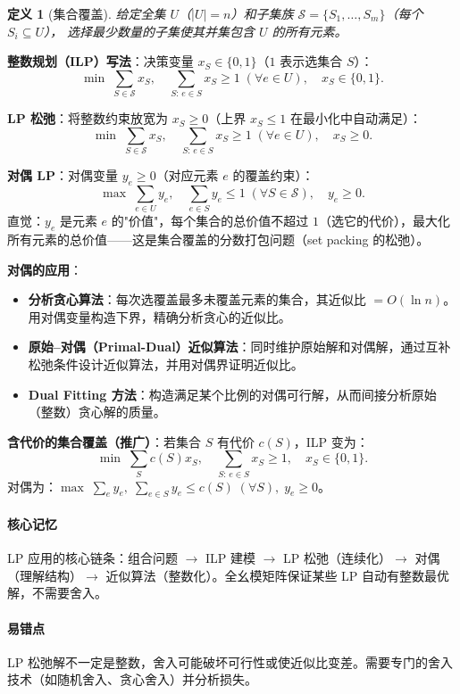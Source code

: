 \documentclass[UTF8,openany,12pt]{ctexbook}
\newtheorem{definition}{定义}[chapter]
\theoremstyle{remark}
\newcommand{\keypoint}[1]{\paragraph{核心记忆}#1}
\newcommand{\pitfall}[1]{\paragraph{易错点}#1}
\begin{document}
\begin{definition}[集合覆盖]
给定全集 $U$（$|U|=n$）和子集族 $\mathcal{S}=\{S_1,\ldots,S_m\}$（每个 $S_i\subseteq U$），
选择最少数量的子集使其并集包含 $U$ 的所有元素。
\end{definition}

\noindent\textbf{整数规划（ILP）写法}：决策变量 $x_S\in\{0,1\}$（$1$ 表示选集合 $S$）：
\[
  \min\;\sum_{S\in\mathcal{S}} x_S,\quad \sum_{S:\,e\in S}x_S\ge 1\;(\forall e\in U),\quad x_S\in\{0,1\}.
\]

\noindent\textbf{LP 松弛}：将整数约束放宽为 $x_S\ge0$（上界 $x_S\le1$ 在最小化中自动满足）：
\[
  \min\;\sum_{S\in\mathcal{S}} x_S,\quad \sum_{S:\,e\in S}x_S\ge 1\;(\forall e\in U),\quad x_S\ge 0.
\]

\noindent\textbf{对偶 LP}：对偶变量 $y_e\ge0$（对应元素 $e$ 的覆盖约束）：
\[
  \max\;\sum_{e\in U}y_e,\quad \sum_{e\in S}y_e\le 1\;(\forall S\in\mathcal{S}),\quad y_e\ge 0.
\]
直觉：$y_e$ 是元素 $e$ 的"价值"，每个集合的总价值不超过 $1$（选它的代价），最大化所有元素的总价值——这是集合覆盖的分数打包问题（set packing 的松弛）。

\noindent\textbf{对偶的应用}：
\begin{itemize}
  \item \textbf{分析贪心算法}：每次选覆盖最多未覆盖元素的集合，其近似比 $=O(\ln n)$。
        用对偶变量构造下界，精确分析贪心的近似比。
  \item \textbf{原始--对偶（Primal-Dual）近似算法}：同时维护原始解和对偶解，通过互补松弛条件设计近似算法，并用对偶界证明近似比。
  \item \textbf{Dual Fitting 方法}：构造满足某个比例的对偶可行解，从而间接分析原始（整数）贪心解的质量。
\end{itemize}

\noindent\textbf{含代价的集合覆盖（推广）}：若集合 $S$ 有代价 $c(S)$，ILP 变为：
\[
  \min\;\sum_{S}c(S)x_S,\quad \sum_{S:\,e\in S}x_S\ge 1,\quad x_S\in\{0,1\}.
\]
对偶为：$\max\;\sum_{e}y_e,\;\sum_{e\in S}y_e\le c(S)\;(\forall S),\;y_e\ge0$。

\keypoint{LP 应用的核心链条：组合问题 $\to$ ILP 建模 $\to$ LP 松弛（连续化）$\to$ 对偶（理解结构）$\to$ 近似算法（整数化）。全幺模矩阵保证某些 LP 自动有整数最优解，不需要舍入。}

\pitfall{LP 松弛解不一定是整数，舍入可能破坏可行性或使近似比变差。需要专门的舍入技术（如随机舍入、贪心舍入）并分析损失。}

\end{document}
